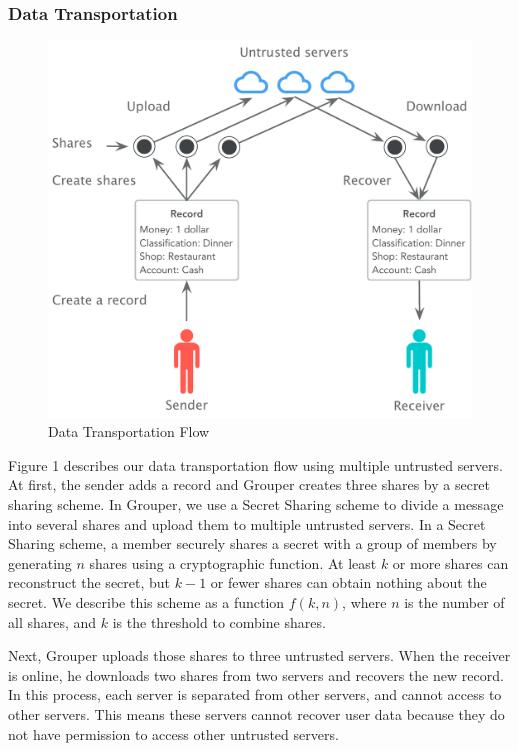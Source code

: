 \documentclass[twocolumn,10pt]{article}
\begin{document}
\subsubsection{Data Transportation}
\begin{figure}[t]
	\centering
	\includegraphics[scale=0.38]{sync_flow}
	\caption{Data Transportation Flow}
\end{figure}

Figure 1 describes our data transportation flow using multiple untrusted servers. 
At first, the sender adds a record and Grouper creates three shares by a secret sharing scheme.
In Grouper, we use a Secret Sharing scheme to divide a message into several shares and upload them to multiple untrusted servers. 
In a Secret Sharing scheme, a member securely shares a secret with a group of members by generating $n$ shares using a cryptographic function. 
At least $k$ or more shares can reconstruct the secret, but $k-1$ or fewer shares can obtain nothing about the secret\cite{pang2005new}. 
We describe this scheme as a function $f(k, n)$, where $n$ is the number of all shares, and $k$ is the threshold to combine shares. 
 
Next, Grouper uploads those shares to three untrusted servers. 
When the receiver is online, he downloads two shares from two servers and recovers the new record. 
In this process, each server is separated from other servers, and cannot access to other servers. 
This means these servers cannot recover user data because they do not have permission to access other untrusted servers. 
\end{document}
